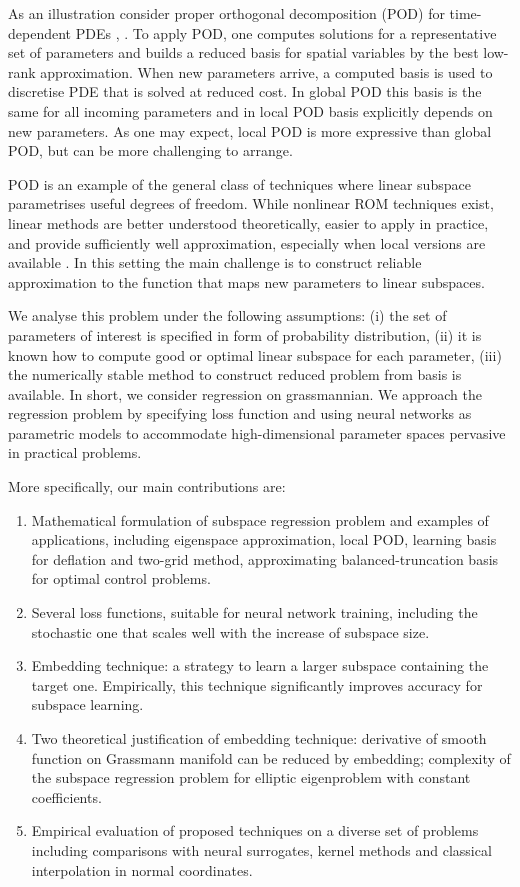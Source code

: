\documentclass{article}
\begin{document}
As an illustration consider proper orthogonal decomposition (POD) for time-dependent PDEs \cite{volkwein2013proper}, \cite{hesthaven2022reduced}. To apply POD, one computes solutions for a representative set of parameters and builds a reduced basis for spatial variables by the best low-rank approximation. When new parameters arrive, a computed basis is used to discretise PDE that is solved at reduced cost. In global POD this basis is the same for all incoming parameters and in local POD basis explicitly depends on new parameters. As one may expect, local POD is more expressive than global POD, but can be more challenging to arrange.

POD is an example of the general class of techniques where linear subspace parametrises useful degrees of freedom. While nonlinear ROM techniques exist, linear methods are better understood theoretically, easier to apply in practice, and provide sufficiently well approximation, especially when local versions are available \cite{franco2024deep}. In this setting the main challenge is to construct reliable approximation to the function that maps new parameters to linear subspaces.

We analyse this problem under the following assumptions: (i) the set of parameters of interest is specified in form of probability distribution, (ii) it is known how to compute good or optimal linear subspace for each parameter, (iii) the numerically stable method to construct reduced problem from basis is available. In short, we consider regression on grassmannian. We approach the regression problem by specifying loss function and using neural networks as parametric models to accommodate high-dimensional parameter spaces pervasive in practical problems.

More specifically, our main contributions are:
\begin{enumerate}
	\item Mathematical formulation of subspace regression problem and examples of applications, including eigenspace approximation, local POD, learning basis for deflation and two-grid method, approximating balanced-truncation basis for optimal control problems.
	\item Several loss functions, suitable for neural network training, including the stochastic one that scales well with the increase of subspace size.
	\item Embedding technique: a strategy to learn a larger subspace containing the target one. Empirically, this technique significantly improves accuracy for subspace learning.
	\item Two theoretical justification of embedding technique: derivative of smooth function on Grassmann manifold can be reduced by embedding; complexity of the subspace regression problem for elliptic eigenproblem with constant coefficients.
	\item Empirical evaluation of proposed techniques on a diverse set of problems including comparisons with neural surrogates, kernel methods and classical interpolation in normal coordinates.
\end{enumerate}
\end{document}
